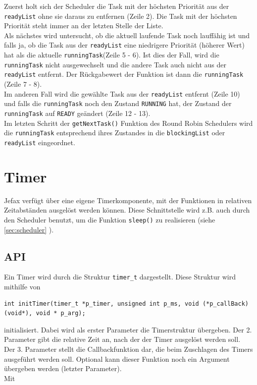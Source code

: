 \documentclass[fontsize=12pt, toc=bibliography, notitlepage]{scrreprt}
\newcommand{\refnn}[1]{\ref{#1} \nameref{#1}}
\begin{document}
Zuerst holt sich der Scheduler die Task mit der höchsten Priorität aus der \lstinline$readyList$ ohne sie daraus zu entfernen (Zeile 2). Die Task mit der höchsten Priorität steht immer an der letzten Stelle der Liste.\\
Als nächstes wird untersucht, ob die aktuell laufende Task noch lauffähig ist und falls ja, ob die Task aus der \lstinline$readyList$ eine niedrigere Priorität (höherer Wert) hat als die aktuelle \lstinline$runningTask$(Zeile 5 - 6). Ist dies der Fall, wird die \lstinline$runningTask$ nicht ausgewechselt und die andere Task auch nicht aus der \lstinline$readyList$ entfernt. Der Rückgabewert der Funktion ist dann die \lstinline$runningTask$ (Zeile 7 - 8).\\
Im anderen Fall wird die gewählte Task aus der \lstinline$readyList$ entfernt (Zeile 10) und falls die \lstinline$runningTask$ noch den Zustand \lstinline$RUNNING$ hat, der Zustand der \lstinline$runningTask$ auf \lstinline$READY$ geändert (Zeile 12 - 13).\\
Im letzten Schritt der \lstinline$getNextTask()$ Funktion des Round Robin Schedulers wird die \lstinline$runningTask$ entsprechend ihres Zustandes in die \lstinline$blockingList$ oder \lstinline$readyList$ eingeordnet.\\

\chapter{Timer}
\label{chap:timer}
Jefax verfügt über eine eigene Timerkomponente, mit der Funktionen in relativen Zeitabständen ausgelöst werden können. Diese Schnittstelle wird z.B. auch durch den Scheduler benutzt, um die Funktion \lstinline$sleep()$ zu realisieren (siehe \refnn{sec:scheduler}).

\section{API}
\label{sec:timer-api}
Ein Timer wird durch die Struktur \lstinline$timer_t$ dargestellt. Diese Struktur wird mithilfe von 

\begin{lstlisting}[title=timer.h]
int initTimer(timer_t *p_timer, unsigned int p_ms, void (*p_callBack) (void*), void * p_arg);
\end{lstlisting}

initialisiert. Dabei wird als erster Parameter die Timerstruktur übergeben. Der 2. Parameter gibt die relative Zeit an, nach der der Timer ausgelöst werden soll. Der 3. Parameter stellt die Callbackfunktion dar, die beim Zuschlagen des Timers ausgeführt werden soll. Optional kann dieser Funktion noch ein Argument übergeben werden (letzter Parameter).\\
Mit 
\end{document}
